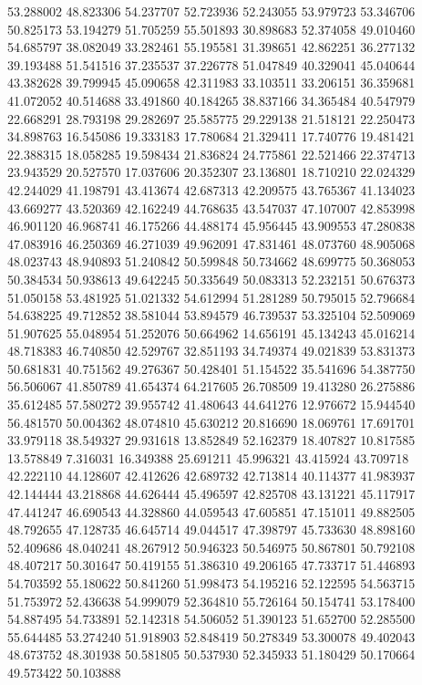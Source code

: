 53.288002
48.823306
54.237707
52.723936
52.243055
53.979723
53.346706
50.825173
53.194279
51.705259
55.501893
30.898683
52.374058
49.010460
54.685797
38.082049
33.282461
55.195581
31.398651
42.862251
36.277132
39.193488
51.541516
37.235537
37.226778
51.047849
40.329041
45.040644
43.382628
39.799945
45.090658
42.311983
33.103511
33.206151
36.359681
41.072052
40.514688
33.491860
40.184265
38.837166
34.365484
40.547979
22.668291
28.793198
29.282697
25.585775
29.229138
21.518121
22.250473
34.898763
16.545086
19.333183
17.780684
21.329411
17.740776
19.481421
22.388315
18.058285
19.598434
21.836824
24.775861
22.521466
22.374713
23.943529
20.527570
17.037606
20.352307
23.136801
18.710210
22.024329
42.244029
41.198791
43.413674
42.687313
42.209575
43.765367
41.134023
43.669277
43.520369
42.162249
44.768635
43.547037
47.107007
42.853998
46.901120
46.968741
46.175266
44.488174
45.956445
43.909553
47.280838
47.083916
46.250369
46.271039
49.962091
47.831461
48.073760
48.905068
48.023743
48.940893
51.240842
50.599848
50.734662
48.699775
50.368053
50.384534
50.938613
49.642245
50.335649
50.083313
52.232151
50.676373
51.050158
53.481925
51.021332
54.612994
51.281289
50.795015
52.796684
54.638225
49.712852
38.581044
53.894579
46.739537
53.325104
52.509069
51.907625
55.048954
51.252076
50.664962
14.656191
45.134243
45.016214
48.718383
46.740850
42.529767
32.851193
34.749374
49.021839
53.831373
50.681831
40.751562
49.276367
50.428401
51.154522
35.541696
54.387750
56.506067
41.850789
41.654374
64.217605
26.708509
19.413280
26.275886
35.612485
57.580272
39.955742
41.480643
44.641276
12.976672
15.944540
56.481570
50.004362
48.074810
45.630212
20.816690
18.069761
17.691701
33.979118
38.549327
29.931618
13.852849
52.162379
18.407827
10.817585
13.578849
7.316031
16.349388
25.691211
45.996321
43.415924
43.709718
42.222110
44.128607
42.412626
42.689732
42.713814
40.114377
41.983937
42.144444
43.218868
44.626444
45.496597
42.825708
43.131221
45.117917
47.441247
46.690543
44.328860
44.059543
47.605851
47.151011
49.882505
48.792655
47.128735
46.645714
49.044517
47.398797
45.733630
48.898160
52.409686
48.040241
48.267912
50.946323
50.546975
50.867801
50.792108
48.407217
50.301647
50.419155
51.386310
49.206165
47.733717
51.446893
54.703592
55.180622
50.841260
51.998473
54.195216
52.122595
54.563715
51.753972
52.436638
54.999079
52.364810
55.726164
50.154741
53.178400
54.887495
54.733891
52.142318
54.506052
51.390123
51.652700
52.285500
55.644485
53.274240
51.918903
52.848419
50.278349
53.300078
49.402043
48.673752
48.301938
50.581805
50.537930
52.345933
51.180429
50.170664
49.573422
50.103888
